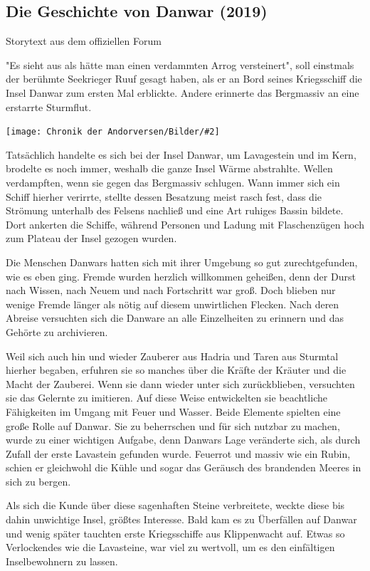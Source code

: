 \documentclass[10pt, a4paper, oneside]{book}
\newcommand{\fillbreak}{\vspace*{\fill}\columnbreak}
\newcommand{\storytext}[1]{%
    \section{#1}%
    \label{Storytext: #1}%
}
\newcommand{\bildmitts}[2][height=0.32\textwidth,width=0.48\textwidth,keepaspectratio]{%
    \begin{center}
        \texttt{[image: Chronik der Andorversen/Bilder/\#2]}
    \end{center}
}
\begin{document}
\begin{multicols}{2}
\fillbreak
\storytext{Die Geschichte von Danwar (2019)}

\begin{center}
    Storytext aus dem offiziellen Forum
\end{center}

"Es sieht aus als hätte man einen verdammten Arrog versteinert", soll einstmals der berühmte Seekrieger Ruuf gesagt haben, als er an Bord seines Kriegsschiff die Insel Danwar zum ersten Mal erblickte. Andere erinnerte das Bergmassiv an eine erstarrte Sturmflut.

\bildmitts{Die Geschichte von Danwar (2019).jpg}

Tatsächlich handelte es sich bei der Insel Danwar, um Lavagestein und im Kern, brodelte es noch immer, weshalb die ganze Insel Wärme abstrahlte. Wellen verdampften, wenn sie gegen das Bergmassiv schlugen. Wann immer sich ein Schiff hierher verirrte, stellte dessen Besatzung meist rasch fest, dass die Strömung unterhalb des Felsens nachließ und eine Art ruhiges Bassin bildete. Dort ankerten die Schiffe, während Personen und Ladung mit Flaschenzügen hoch zum Plateau der Insel gezogen wurden.\bigskip

Die Menschen Danwars hatten sich mit ihrer Umgebung so gut zurechtgefunden, wie es eben ging. Fremde wurden herzlich willkommen geheißen, denn der Durst nach Wissen, nach Neuem und nach Fortschritt war groß. Doch blieben nur wenige Fremde länger als nötig auf diesem unwirtlichen Flecken. Nach deren Abreise versuchten sich die Danware an alle Einzelheiten zu erinnern und das Gehörte zu archivieren.\bigskip

Weil sich auch hin und wieder Zauberer aus Hadria und Taren aus Sturmtal hierher begaben, erfuhren sie so manches über die Kräfte der Kräuter und die Macht der Zauberei. Wenn sie dann wieder unter sich zurückblieben, versuchten sie das Gelernte zu imitieren. Auf diese Weise entwickelten sie beachtliche Fähigkeiten im Umgang mit Feuer und Wasser. Beide Elemente spielten eine große Rolle auf Danwar. Sie zu beherrschen und für sich nutzbar zu machen, wurde zu einer wichtigen Aufgabe, denn Danwars Lage veränderte sich, als durch Zufall der erste Lavastein gefunden wurde. Feuerrot und massiv wie ein Rubin, schien er gleichwohl die Kühle und sogar das Geräusch des brandenden Meeres in sich zu bergen.

Als sich die Kunde über diese sagenhaften Steine verbreitete, weckte diese bis dahin unwichtige Insel, größtes Interesse. Bald kam es zu Überfällen auf Danwar und wenig später tauchten erste Kriegsschiffe aus Klippenwacht auf. Etwas so Verlockendes wie die Lavasteine, war viel zu wertvoll, um es den einfältigen Inselbewohnern zu lassen.\bigskip


\end{multicols}
\end{document}
